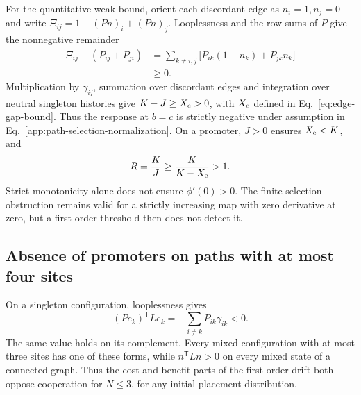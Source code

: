 \documentclass[aps,pre,reprint,amsmath,amssymb,longbibliography]{revtex4-2}
\begin{document}
For the quantitative weak bound, orient each discordant edge as
$n_i=1,n_j=0$ and write $\Xi_{ij}=1-(Pn)_i+(Pn)_j$. Looplessness
and the row sums of $P$ give the nonnegative remainder
\begin{equation}
 \begin{aligned}
 \Xi_{ij}-(P_{ij}+P_{ji})
 &=\sum_{k\ne i,j}\bigl[P_{ik}(1-n_k)+P_{jk}n_k\bigr]\\
 &\ge0.
 \end{aligned}
 \label{app:path-edge-gap}
\end{equation}
Multiplication by $\gamma_{ij}$, summation over discordant edges and
integration over neutral singleton histories give $K-J\ge X_{\rm e}>0$,
with $X_{\rm e}$ defined in Eq.~\eqref{eq:edge-gap-bound}. Thus the
response at $b=c$ is strictly negative under
assumption in Eq.~\eqref{app:path-selection-normalization}. On a promoter,
$J>0$ ensures $X_{\rm e}<K$, and
\begin{equation}
 R=\frac KJ\ge\frac K{K-X_{\rm e}}>1.
 \label{app:path-universal-weak-bound}
\end{equation}
Strict monotonicity alone does not ensure $\phi'(0)>0$.  The finite-selection
obstruction remains valid for a strictly increasing map with zero derivative
at zero, but a first-order threshold then does not detect it.

\subsection{Absence of promoters on paths with at most four sites}
\label{app:path-small-no-go}\label{app:path-small}

On a singleton configuration, looplessness gives
\begin{equation}
 (Pe_k)^{\mathsf T}Le_k=-\sum_{i\ne k}P_{ik}\gamma_{ik}<0.
 \label{app:path-singleton-no-go}
\end{equation}
The same value holds on its complement. Every mixed configuration with
at most three sites has one of these forms, while
$n^{\mathsf T}Ln>0$ on every mixed state of a connected graph.
Thus the cost and benefit parts of the first-order drift both oppose
cooperation for $N\leq3$, for any initial placement distribution.
\end{document}
